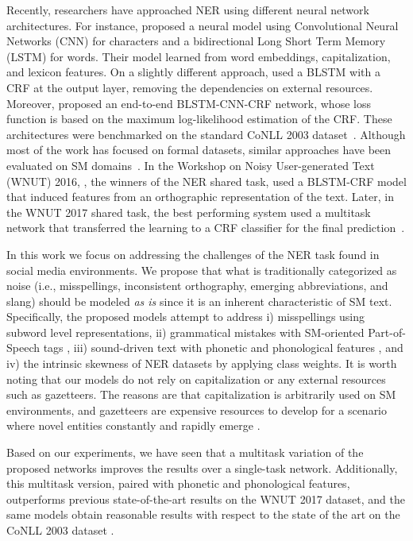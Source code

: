 \documentclass[11pt,a4paper]{article}
\begin{document}
Recently, researchers have approached NER using different neural network architectures. For instance, \citet{DBLP:journals/corr/ChiuN15} proposed a neural model using Convolutional Neural Networks (CNN) for characters and a bidirectional Long Short Term Memory (LSTM) for words. Their model learned from word embeddings, capitalization, and lexicon features. On a slightly different approach, \citet{DBLP:journals/corr/LampleBSKD16} used a BLSTM with a CRF at the output layer, removing the dependencies on external resources. Moreover, \citet{MaAndHovy:16} proposed an end-to-end BLSTM-CNN-CRF network, whose loss function is based on the maximum log-likelihood estimation of the CRF. These architectures were benchmarked on the standard CoNLL 2003 dataset~\citep{TjongKimSang-DeMeulder:03}. Although most of the work has focused on formal datasets, similar approaches have been evaluated on SM domains~\citep{StraussEtAl:16, DerczynskiEtAl:17}. In the Workshop on Noisy User-generated Text (WNUT) 2016, \citet{LimsopathamAndCollier:16}, the winners of the NER shared task, used a BLSTM-CRF model that induced features from an orthographic representation of the text. Later, in the WNUT 2017 shared task, the best performing system used a multitask network that transferred the learning to a CRF classifier for the final prediction~\citep{AguilarEtAl:17}.

In this work we focus on addressing the challenges of the NER task found in social media environments. We propose that what is traditionally categorized as noise (i.e., misspellings, inconsistent orthography, emerging abbreviations, and slang) should be modeled \textit{as is} since it is an inherent characteristic of SM text. Specifically, the proposed models attempt to address i) misspellings using subword level representations, ii) grammatical mistakes with SM-oriented Part-of-Speech tags \citep{owoputi2013improved}, iii) sound-driven text with phonetic and phonological features \citep{bharadwaj-EtAl:2016:EMNLP2016}, and iv) the intrinsic skewness of NER datasets by applying class weights. It is worth noting that our models do not rely on capitalization or any external resources such as gazetteers. The reasons are that capitalization is arbitrarily used on SM environments, and gazetteers are expensive resources to develop for a scenario where novel entities constantly and rapidly emerge \citep{DerczynskiEtAl:17, AugensteinEtAl:17}.

Based on our experiments, we have seen that a multitask variation of the proposed networks improves the results over a single-task network. Additionally, this multitask version, paired with phonetic and phonological features, outperforms previous state-of-the-art results on the WNUT 2017 dataset, and the same models obtain reasonable results with respect to the state of the art on the CoNLL 2003 dataset \citep{TjongKimSang-DeMeulder:03}.
\end{document}
